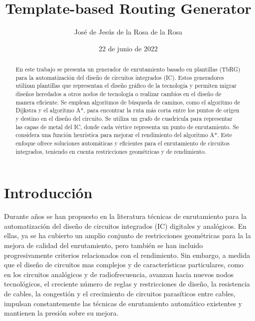 \documentclass[reprint,amsmath,amssymb,aps]{revtex4-2}
\begin{document}

\title{Template-based Routing Generator}
\author{José de Jesús de la Rosa de la Rosa}
\date{22 de junio de 2022}

\begin{abstract}
En este trabajo se presenta un generador de enrutamiento basado en plantillas (TbRG) para la automatización del diseño de circuitos integrados (IC). Estos generadores utilizan plantillas que representan el diseño gráfico de la tecnología y permiten migrar diseños heredados a otros nodos de tecnología o realizar cambios en el diseño de manera eficiente. Se emplean algoritmos de búsqueda de caminos, como el algoritmo de Dijkstra y el algoritmo A*, para encontrar la ruta más corta entre los puntos de origen y destino en el diseño del circuito. Se utiliza un grafo de cuadrícula para representar las capas de metal del IC, donde cada vértice representa un punto de enrutamiento. Se considera una función heurística para mejorar el rendimiento del algoritmo A*. Este enfoque ofrece soluciones automáticas y eficientes para el enrutamiento de circuitos integrados, teniendo en cuenta restricciones geométricas y de rendimiento.
\end{abstract}


\maketitle 

\section{Introducción}

Durante años se han propuesto en la literatura técnicas de enrutamiento para la automatización del diseño de circuitos integrados (IC) digitales y analógicos. En ellas, ya se ha cubierto un amplio conjunto de restricciones geométricas para la la mejora de calidad del enrutamiento, pero también se han incluido progresivamente criterios relacionados con el rendimiento. Sin embargo, a medida que el diseño de circuitos mas complejos y de características particulares, como en los circuitos analógicos y de radiofrecuencia, avanzan hacia nuevos nodos tecnológicos, el creciente número de reglas y restricciones de diseño, la resistencia de cables, la congestión y el crecimiento de circuitos parasíticos entre cables, impulsan constantemente las técnicas de enrutamiento automático existentes y mantienen la presión sobre su mejora.
\end{document}
